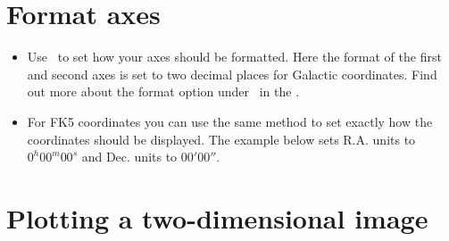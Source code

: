 \documentclass[11pt,oneside,chapters]{starlink}
\begin{document}
\section{Format axes}
\begin{itemize}
\item Use \wcsattrib\ to set how your axes should be formatted. Here
the format of the first and second axes is set to two decimal places
for Galactic coordinates. Find out more about the format option under
\wcsattrib\ in the .
\begin{terminalv}
\end{terminalv}

\item For FK5 coordinates you can use the same method to set exactly
how the coordinates should be displayed. The example below sets R.A.
units to $0^h00^m00^s$ and Dec. units to $00'00''$.
\begin{terminalv}
\end{terminalv}
\end{itemize}

\newpage

\section{Plotting a two-dimensional image}
\end{document}
